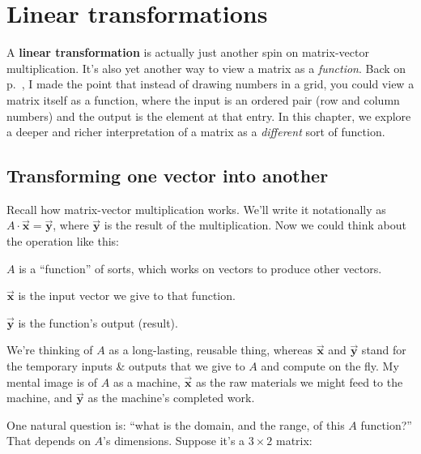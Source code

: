

\chapter{Linear transformations}


A \textbf{linear transformation} is actually just another spin on matrix-vector
multiplication. It's also yet another way to view a matrix as a
\textit{function}. Back on p.~\pageref{matrixIsFunction}, I made the point that
instead of drawing numbers in a grid, you could view a matrix itself as a
function, where the input is an ordered pair (row and column numbers) and the
output is the element at that entry. In this chapter, we explore a deeper and
richer interpretation of a matrix as a \textit{different} sort of function.

\section{Transforming one vector into another}

Recall how matrix-vector multiplication works. We'll write it notationally as
$A \cdot \overrightarrow{\textbf{x}} = \overrightarrow{\textbf{y}}$, where
$\overrightarrow{\textbf{y}}$ is the result of the multiplication. Now we could
think about the operation like this:

\begin{compactitem}
\item $A$ is a ``function'' of sorts, which works on vectors to produce other
vectors.
\item $\overrightarrow{\textbf{x}}$ is the input vector we give to that
function.
\item $\overrightarrow{\textbf{y}}$ is the function's output (result).
\end{compactitem}

We're thinking of $A$ as a long-lasting, reusable thing, whereas
$\overrightarrow{\textbf{x}}$ and $\overrightarrow{\textbf{y}}$ stand for the
temporary inputs \& outputs that we give to $A$ and compute on the fly. My
mental image is of $A$ as a machine, $\overrightarrow{\textbf{x}}$ as the raw
materials we might feed to the machine, and $\overrightarrow{\textbf{y}}$ as
the machine's completed work.

One natural question is: ``what is the domain, and the range, of this $A$
function?'' That depends on $A$'s dimensions. Suppose it's a $3\times 2$
matrix:

